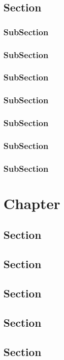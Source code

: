 \section{Section}

\subsection{SubSection}
\subsection{SubSection}
\subsection{SubSection}
\subsection{SubSection}
\subsection{SubSection}
\subsection{SubSection}
\subsection{SubSection}



\chapter{Chapter}

\section{Section}
\section{Section}
\section{Section}
\section{Section}
\section{Section}
